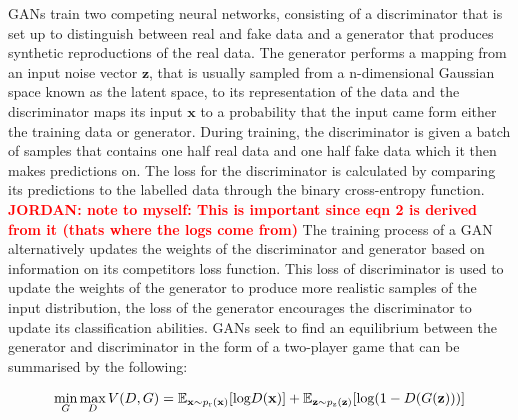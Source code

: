 \documentclass[12pt]{iopart}
\newcommand{\jordan}[1]{\textbf{\textcolor{red}{JORDAN: #1}}}
\newcommand{\chris}[1]{\textbf{\textcolor{green}{CHRIS: #1}}}
\begin{document}
%
\acp{GAN} train two competing neural networks, consisting of a discriminator
that is set up to distinguish between real and fake data and a generator that
produces synthetic reproductions of the real data. The generator performs a
mapping from an input noise vector $\mathbf{z}$, that is usually sampled from a n-dimensional Gaussian space known as the latent space, to its representation of the
data and the discriminator maps its input $\mathbf{x}$ to a probability that
the input came form either the training data or generator.  During training,
the discriminator is given a batch of samples that contains one half real data
and one half fake data which it then makes predictions on. The loss for the
discriminator is calculated by comparing its predictions to the labelled data
through the binary cross-entropy function. \jordan{note to myself: This is important since eqn 2 is derived from it (thats where the logs come from)} The training process of a \ac{GAN}
alternatively updates the weights of the discriminator and generator based on
information on its competitors loss function. This loss of discriminator is
used to update the weights of the generator to produce more realistic samples
of the input distribution, the loss of the generator encourages the
discriminator to update its classification abilities. GANs seek to find an equilibrium between the generator and discriminator in the form of a two-player game that can be summarised by the following:  

%
\begin{equation}
\mathop{\text{min}}_{G}  \mathop{\text{max}}_{D} V(D,G) = \mathbb{E}_{\mathbf{x} \sim p_{\text{r}}(\mathbf{x})} [\text{log} D(\mathbf{x})] \\ + \mathbb{E}_{\mathbf{z} \sim p_{\text{z}}(\mathbf{z})} [\text{log}(1-D(G(\mathbf{z})))]
\label{equation:GANloss}
\end{equation}
\end{document}

